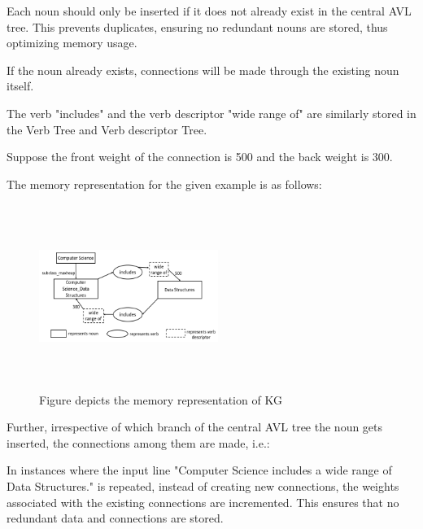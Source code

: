 \documentclass[conference]{IEEEtran}
\begin{document}
Each noun should only be inserted if it does not already exist in the central AVL tree. 
This prevents duplicates, ensuring no redundant nouns are stored, thus optimizing memory usage.

If the noun already exists, connections will be made through the existing noun itself.

The verb "includes" and the verb descriptor "wide range of" are similarly stored in the Verb Tree and Verb descriptor Tree.

Suppose the front weight of the connection is 500 and the back weight is 300.

The memory representation for the given example is as follows: 

\begin{figure}[htbp]
\centerline{\includegraphics[width=0.52\textwidth , height=6cm]{example_4.png}}
\caption{Figure depicts the memory representation of KG}
\label{fig}
\end{figure}

Further, irrespective of which branch of the central AVL tree the noun gets inserted, 
the connections among them are made, i.e.:



In instances where the input line "Computer Science includes a wide range of Data Structures." is 
repeated, instead of creating new connections, the weights associated with the existing connections 
are incremented. This ensures that no redundant data and connections are stored.
\end{document}
